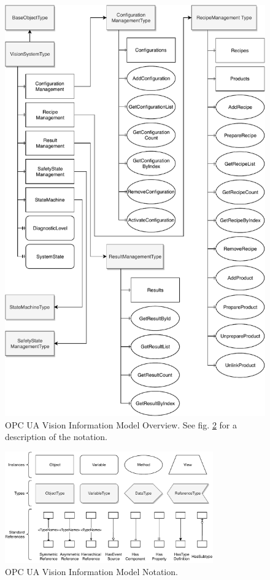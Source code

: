 \begin{figure}
    \centering
    \includegraphics[height=0.9\textheight]{img/OPCUAVisionInformationModelOverview.pdf}
    \caption[OPC UA Vision Information Model Overview]{OPC UA Vision Information Model Overview. See fig. \ref{fig:OPCInfoModelNotation} for a description of the notation.\cite{VDMA2018OPCSpecification}}
    \label{fig:OPCInfoModelOverview}
\end{figure}

\begin{figure}[ht]
    \centering
    \includegraphics[width=0.8\textwidth]{img/OPCUAVisionInformationModelNotation.pdf}
    \caption[OPC UA Vision Information Model Notation]{OPC UA Vision Information Model Notation.\cite{VDMA2018OPCSpecification}}
    \label{fig:OPCInfoModelNotation}
\end{figure}

